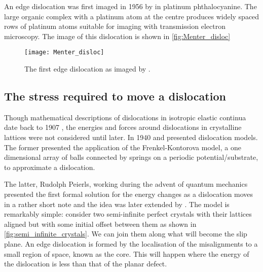 An edge dislocation was first imaged in 1956 by \citet{Menter1956} in platinum phthalocyanine. The large organic complex with a platinum atom at the centre produces widely spaced rows of platinum atoms suitable for imaging with transmission electron microscopy. The image of this dislocation is shown in \autoref{fig:Menter_disloc}

\begin{figure}
\centering
\texttt{[image: Menter\_disloc]}
\caption{The first edge dislocation as imaged by \citet{Menter1956}.\label{fig:Menter_disloc}}
\end{figure}





\subsection{The stress required to move a dislocation}



Though mathematical descriptions of dislocations in isotropic elastic continua date back to 1907 \cite{Volterra1907}, the energies and forces around dislocations in crystalline lattices were not considered until later. In 1940 \citet{Dehlinger1940} and \citet{Peierls1940} presented dislocation models. The former presented the application of the Frenkel-Kontorova model, a one dimensional array of balls connected by springs on a periodic potential/substrate, to approximate a dislocation.

The latter, Rudolph Peierls, working during the advent of quantum mechanics presented the first formal solution for the energy changes as a dislocation moves in a rather short note \cite{Peierls1940} and the idea was later extended by \citet{Nabarro1947}. The model is remarkably simple: consider two semi-infinite perfect crystals with their lattices aligned but with some initial offset between them as shown in \autoref{fig:semi_infinite_crystals}. We can join them along what will become the slip plane. An edge dislocation is formed  by the localisation of the misalignments to a small region of space, known as the core. This will happen where the energy of the dislocation is less than that of the planar defect.



